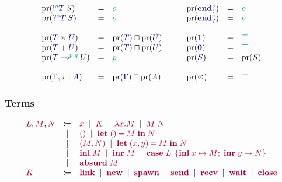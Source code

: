 \documentclass[main.tex]{subfiles}
\begin{document}
\[
\begin{array}{lcl}
  \pr(\ty{\tysend[\cs{o}]{T}{S}}) & = & \cs{o} \\
  \pr(\ty{\tyrecv[\cs{o}]{T}{S}}) & = & \cs{o} \\
  \\
  \pr(\ty{\typrod{T}{U}}) & = & \pr({\ty{T}})\sqcap\pr({\ty{U}}) \\
  \pr(\ty{\tysum{T}{U}})  & = & \pr({\ty{T}})\sqcap\pr({\ty{U}}) \\
  \pr(\ty{\tylolli[\cs{p},\cs{q}]{T}{U}}) & = & \cs{p} \\
  \\
  \pr(\ty{\Gamma}, \tmty{x}{A}) & = & \pr(\ty{\Gamma})\sqcap\pr(\ty{A})
\end{array}
\qquad
\begin{array}{lcl}
  \pr(\ty{\tyends[\cs{o}]}) & = & \cs{o} \\
  \pr(\ty{\tyendr[\cs{o}]}) & = & \cs{o} \\
  \\
  \pr(\ty{\tyunit})         & = & \ptop \\
  \pr(\ty{\tyvoid})         & = & \ptop \\
  \pr(\ty{S})               & = & \pr(\ty{S}) \\
  \\
  \pr(\ty{\emptyenv})       & = & \ptop
\end{array}
\]

\subsubsection{Terms}%
\label{sec:pgv-syntax-terms}
\[
\begin{array}{lcl}
  \tm{L}, \tm{M}, \tm{N}
  & \coloneqq & \tm{x}
    \sep        \tm{K}
    \sep        \tm{\lambda x.M}
    \sep        \tm{M\;N} \\
  & \sep      & \tm{\unit}
    \sep        \tm{\letunit{M}{N}} \\
  & \sep      & \tm{\pair{M}{N}}
    \sep        \tm{\letpair{x}{y}{M}{N}} \\
  & \sep      & \tm{\inl{M}}
    \sep        \tm{\inr{M}}
    \sep        \tm{\casesum{L}{x}{M}{y}{N}} \\
  & \sep      & \tm{\absurd{M}} \\
  \tm{K}
  & \coloneqq & \tm{\link}
    \sep        \tm{\new}
    \sep        \tm{\spawn}
    \sep        \tm{\send}
    \sep        \tm{\recv}
    \sep        \tm{\wait}
    \sep        \tm{\close}
\end{array}
\]
\end{document}
